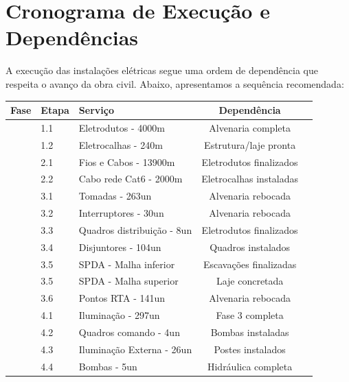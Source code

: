 \documentclass[12pt,a4paper]{article}
\renewenvironment{table}%
{\begin{center}%
\scriptsize%
\addtolength{\tabcolsep}{-2pt}%
}%
{\end{center}}
\begin{document}
\pagebreak

\section{Cronograma de Execução e Dependências}

A execução das instalações elétricas segue uma ordem de dependência que respeita o avanço da obra civil. Abaixo, apresentamos a sequência recomendada:

\begin{table}
\centering
\begin{tabular}{cllcr}
\toprule
\textbf{Fase} & \textbf{Etapa} & \textbf{Serviço} & \textbf{Dependência} \\
\midrule
 & 1.1 & Eletrodutos - 4000m & Alvenaria completa \\
 & 1.2 & Eletrocalhas - 240m & Estrutura/laje pronta \\
\midrule
 & 2.1 & Fios e Cabos - 13900m & Eletrodutos finalizados \\
 & 2.2 & Cabo rede Cat6 - 2000m & Eletrocalhas instaladas \\
\midrule
 & 3.1 & Tomadas - 263un & Alvenaria rebocada \\
 & 3.2 & Interruptores - 30un & Alvenaria rebocada \\
  & 3.3 & Quadros distribuição - 8un & Eletrodutos finalizados \\
 & 3.4 & Disjuntores - 104un & Quadros instalados \\
 & 3.5 & SPDA - Malha inferior & Escavações finalizadas \\
  & 3.5 & SPDA - Malha superior & Laje concretada \\
 & 3.6 & Pontos RTA - 141un & Alvenaria rebocada \\
\midrule
 & 4.1 & Iluminação - 297un & Fase 3 completa \\
 & 4.2 & Quadros comando - 4un & Bombas instaladas \\
 & 4.3 & Iluminação Externa - 26un & Postes instalados \\
 & 4.4 & Bombas - 5un & Hidráulica completa \\
\bottomrule
\end{tabular}
\end{table}

\end{document}
